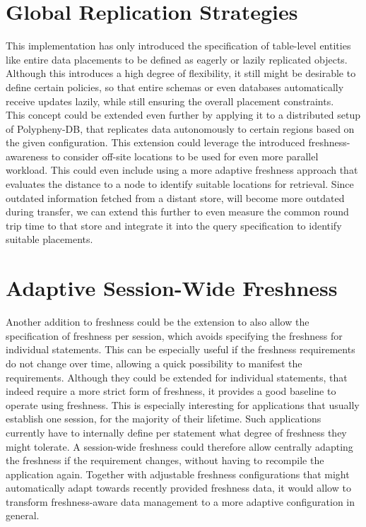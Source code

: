 
\tocless\section{Global Replication Strategies}
This implementation has only introduced the specification of table-level entities like entire data placements to be defined as eagerly or lazily replicated objects.
Although this introduces a high degree of flexibility, it still might be desirable to define certain policies, so that entire schemas or even databases automatically 
receive updates lazily, while still ensuring the overall placement constraints.\\
This concept could be extended even further by applying it to a distributed setup of Polypheny-DB, that replicates data autonomously to certain regions based on the given 
configuration. 
This extension could leverage the introduced freshness-awareness to consider off-site locations to be used for even more parallel workload.
This could even include using a more adaptive freshness approach that evaluates the distance to a node to identify suitable locations for retrieval.
Since outdated information fetched from a distant store, will become more outdated during transfer, we can
extend this further to even measure the common round trip time to that store and integrate it into the query specification to identify suitable placements.\\

 





\tocless\section{Adaptive Session-Wide Freshness}
Another addition to freshness could be the extension to also allow the specification
of freshness per session, which avoids specifying the freshness for individual statements.
This can be especially useful if the freshness requirements do not change over time, allowing a quick
possibility to manifest the requirements. Although they could be extended for individual statements,
that indeed require a more strict form of freshness, it provides a good baseline to operate using freshness.
This is especially interesting for applications that usually establish one session, for the majority of their lifetime. 
Such applications currently have to internally define per statement what degree of freshness they might tolerate. 
A session-wide freshness could therefore allow centrally adapting the freshness if the requirement changes, without having to recompile the application again.
Together with adjustable freshness configurations that might automatically adapt towards recently provided freshness data, it would allow
to transform freshness-aware data management to a more adaptive configuration in general.



